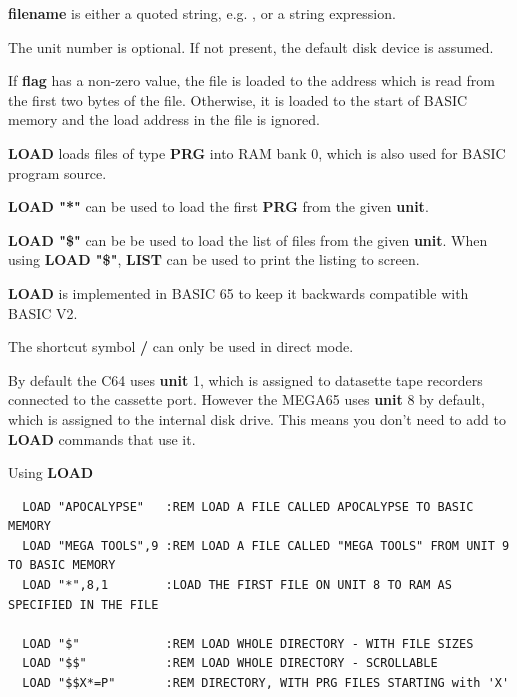 \begin{description}[leftmargin=2cm,style=nextline]
   {\bf filename} is either a quoted string, e.g. , or
   a string expression.

   The unit number is optional.
   If not present, the default disk device is assumed.

   If {\bf flag} has a non-zero value, the file is loaded to
   the address which is read from the first two bytes of the file.
   Otherwise, it is loaded to the start of BASIC memory and
   the load address in the file is ignored.

\item [Remarks:]
   {\bf LOAD} loads files of type {\bf PRG} into RAM bank 0,
   which is also used for BASIC program source.

   {\bf LOAD "*"} can be used to load the first {\bf PRG} from the
   given {\bf unit}.

   {\bf LOAD "\$"} can be be used to load
   the list of files from the given {\bf unit}. When using {\bf LOAD "\$"},
   {\bf LIST} can be used to print the listing to screen.

   {\bf LOAD} is implemented in BASIC 65 to keep it backwards
   compatible with BASIC V2.

   The shortcut symbol {\bf /} can only be used in direct mode.

   By default the C64 uses {\bf unit} 1, which is assigned to datasette
   tape recorders connected to the cassette port. However the MEGA65
   uses {\bf unit} 8 by default, which is assigned to the internal
   disk drive. This means you don't need to add  to
   {\bf LOAD} commands that use it.

\item [Examples:] Using {\bf LOAD}
\begin{tcolorbox}[colback=black,coltext=white]
\verbatimfont{\codefont}
\begin{verbatim}
  LOAD "APOCALYPSE"   :REM LOAD A FILE CALLED APOCALYPSE TO BASIC MEMORY
  LOAD "MEGA TOOLS",9 :REM LOAD A FILE CALLED "MEGA TOOLS" FROM UNIT 9 TO BASIC MEMORY
  LOAD "*",8,1        :LOAD THE FIRST FILE ON UNIT 8 TO RAM AS SPECIFIED IN THE FILE

  LOAD "$"            :REM LOAD WHOLE DIRECTORY - WITH FILE SIZES
  LOAD "$$"           :REM LOAD WHOLE DIRECTORY - SCROLLABLE
  LOAD "$$X*=P"       :REM DIRECTORY, WITH PRG FILES STARTING with 'X'
\end{verbatim}
\end{tcolorbox}
\end{description}

